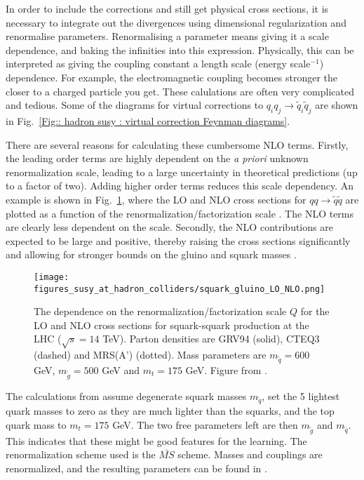 \documentclass[twoside,english]{uiofysmaster}
\begin{document}
{In order to include the corrections and still get physical cross sections, it is necessary to integrate out the divergences using dimensional regularization and renormalise parameters. Renormalising a parameter means giving it a scale dependence, and baking the infinities into this expression. Physically, this can be interpreted as giving the coupling constant a length scale (energy scale$^{-1}$) dependence. For example, the electromagnetic coupling becomes stronger the closer to a charged particle you get. These calulations are often very complicated and tedious. Some of the diagrams for virtual corrections to $q_iq_j \rightarrow \widetilde{q}_i \widetilde{q}_j$ are shown in Fig.~\ref{Fig:: hadron susy : virtual correction Feynman diagrams}.

There are several reasons for calculating these cumbersome NLO terms. Firstly, the leading order terms are highly dependent on the \textit{a priori} unknown renormalization scale, leading to a large uncertainty in theoretical predictions (up to a factor of two). Adding higher order terms reduces this scale dependency. An example is shown in Fig.~\ref{Fig:: hadron susy : LO vs NLO beenakker}, where the LO and NLO cross sections for $qq \rightarrow \widetilde{q} \widetilde{q}$ are plotted as a function of the renormalization/factorization scale \cite{beenakker1997squark}. The NLO terms are clearly less dependent on the scale.  Secondly, the NLO contributions are expected to be large and positive, thereby raising the cross sections significantly and allowing for stronger bounds on the gluino and squark masses \cite{beenakker1997squark}.

\begin{figure}
\centering
\texttt{[image: figures\_susy\_at\_hadron\_colliders/squark\_gluino\_LO\_NLO.png]}
\caption{The dependence on the renormalization/factorization scale $Q$ for the LO and NLO cross sections for squark-squark production at the LHC ($\sqrt{s}=14$ TeV). Parton densities are GRV94 (solid), CTEQ3 (dashed) and MRS(A') (dotted). Mass parameters are $m_{\widetilde{q}}=600$ GeV, $m_{\widetilde{g}}=500$ GeV and $m_t=175$ GeV. Figure from \cite{beenakker1997squark}.}
\label{Fig:: hadron susy : LO vs NLO beenakker}
\end{figure}


The calculations from \cite{beenakker1997squark} assume degenerate squark masses $m_{\widetilde{q}}$, set the 5 lightest quark masses to zero as they are much lighter than the squarks, and the top quark mass to $m_t =175$ GeV. The two free parameters left are then $m_{\widetilde{g}}$ and $m_{\widetilde{q}}$. This indicates that these might be good features for the learning. The renormalization scheme used is the $\bar{MS}$ scheme. Masses and couplings are renormalized, and the resulting parameters can be found in \cite{beenakker1997squark}.

}
\end{document}
